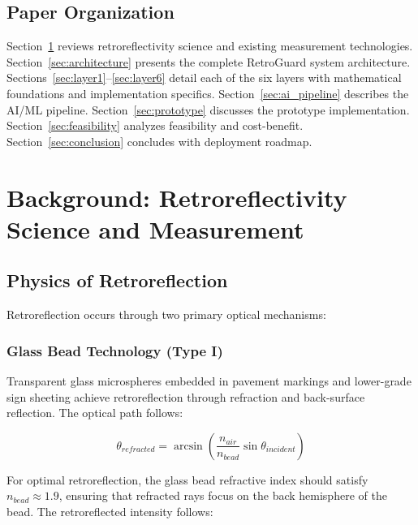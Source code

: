 \documentclass[11pt,a4paper]{article}
\begin{document}
\subsection{Paper Organization}

Section~\ref{sec:background} reviews retroreflectivity science and existing measurement technologies. Section~\ref{sec:architecture} presents the complete RetroGuard system architecture. Sections~\ref{sec:layer1}--\ref{sec:layer6} detail each of the six layers with mathematical foundations and implementation specifics. Section~\ref{sec:ai_pipeline} describes the AI/ML pipeline. Section~\ref{sec:prototype} discusses the prototype implementation. Section~\ref{sec:feasibility} analyzes feasibility and cost-benefit. Section~\ref{sec:conclusion} concludes with deployment roadmap.


\section{Background: Retroreflectivity Science and Measurement}
\label{sec:background}

\subsection{Physics of Retroreflection}

Retroreflection occurs through two primary optical mechanisms:

\subsubsection{Glass Bead Technology (Type I)}

Transparent glass microspheres embedded in pavement markings and lower-grade sign sheeting achieve retroreflection through refraction and back-surface reflection. The optical path follows:

\begin{equation}
\theta_{refracted} = \arcsin\left(\frac{n_{air}}{n_{bead}} \sin\theta_{incident}\right)
\label{eq:snell}
\end{equation}

For optimal retroreflection, the glass bead refractive index should satisfy $n_{bead} \approx 1.9$, ensuring that refracted rays focus on the back hemisphere of the bead. The retroreflected intensity follows:
\end{document}
